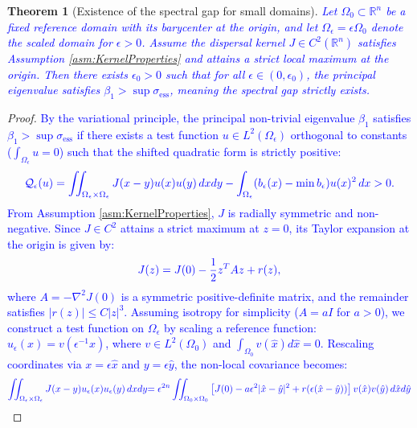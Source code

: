 \documentclass[12pt, a4paper]{article}
\newcommand{\revision}[1]{\textcolor{blue}{#1}}
\theoremstyle{break}
\newtheorem{thm}{Theorem}[section]
\theoremstyle{break}
\theoremstyle{break}
\theoremstyle{break}
\theoremstyle{break}
\theoremstyle{break}
\theoremstyle{break}
\theoremstyle{break}
\theoremstyle{break}
\begin{document}
\begin{thm}[Existence of the spectral gap for small domains]
    \label{thm:spectral_gap_existence}
    \revision{Let $\Omega_0 \subset \mathbb{R}^n$ be a fixed reference domain with its barycenter at the origin, and let $\Omega_\epsilon = \epsilon \Omega_0$ denote the scaled domain for $\epsilon > 0$. Assume the dispersal kernel $J \in C^2(\mathbb{R}^n)$ satisfies Assumption \ref{asm:KernelProperties} and attains a strict local maximum at the origin. Then there exists $\epsilon_0 > 0$ such that for all $\epsilon \in (0, \epsilon_0)$, the principal eigenvalue satisfies $\beta_1 > \sup \sigma_{\mathrm{ess}}$, meaning the spectral gap strictly exists.}
\end{thm}
\begin{proof}
    \revision{By the variational principle, the principal non-trivial eigenvalue $\beta_1$ satisfies $\beta_1 > \sup \sigma_{\mathrm{ess}}$ if there exists a test function $u \in L^2(\Omega_\epsilon)$ orthogonal to constants ($\int_{\Omega_\epsilon} u = 0$) such that the shifted quadratic form is strictly positive:}
    \begin{equation}
        \revision{\mathcal{Q}_\epsilon(u) = \iint_{\Omega_\epsilon \times \Omega_\epsilon} J(x-y)u(x)u(y) \,dx dy - \int_{\Omega_\epsilon} (b_\epsilon(x) - \min b_\epsilon) u(x)^2 \,dx > 0.}
    \end{equation}
    \revision{From Assumption \ref{asm:KernelProperties}, $J$ is radially symmetric and non-negative. Since $J \in C^2$ attains a strict maximum at $z=0$, its Taylor expansion at the origin is given by:}
    \begin{equation}
        \revision{J(z) = J(0) - \frac{1}{2} z^T A z + r(z),}
    \end{equation}
    \revision{where $A = -\nabla^2 J(0)$ is a symmetric positive-definite matrix, and the remainder satisfies $|r(z)| \le C|z|^3$. Assuming isotropy for simplicity ($A = aI$ for $a > 0$), we construct a test function on $\Omega_\epsilon$ by scaling a reference function: $u_\epsilon(x) = v(\epsilon^{-1}x)$, where $v \in L^2(\Omega_0)$ and $\int_{\Omega_0} v(\hat{x})d\hat{x} = 0$. Rescaling coordinates via $x = \epsilon \hat{x}$ and $y = \epsilon \hat{y}$, the non-local covariance becomes:}
    \begin{align}
        \revision{\iint_{\Omega_\epsilon \times \Omega_\epsilon} J(x-y)u_\epsilon(x)u_\epsilon(y) \,dx dy} 
        &\revision{= \epsilon^{2n} \iint_{\Omega_0 \times \Omega_0} \left[ J(0) - a\epsilon^2 |\hat{x}-\hat{y}|^2 + r(\epsilon(\hat{x}-\hat{y})) \right] v(\hat{x})v(\hat{y}) \,d\hat{x} d\hat{y}} \\

\end{align}
\end{proof}
\end{document}
